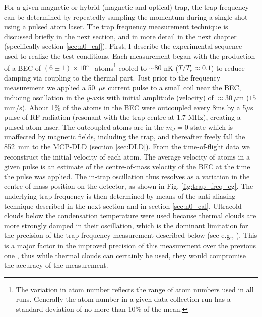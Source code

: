	For a given magnetic or hybrid (magnetic and optical) trap, the trap frequency can be determined by repeatedly sampling the momentum during a single shot using a pulsed atom laser. 
	The trap frequency measurement technique is discussed briefly in the next section, and in more detail in the next chapter (specifically section \ref{sec:n0_cal}). 
	First, I describe the experimental sequence used to realize the test conditions.
	Each measurement began with the production of a BEC of $(6\pm1)\times10^5$ \mhe~atoms\footnote{The variation in atom number reflects the range of atom numbers used in all runs. Generally the atom number in a given data collection run has a standard deviation of no more than 10\% of the mean.} cooled to $\sim80$ nK ($T/T_c\approx 0.1$) to reduce damping via coupling to the thermal part.
	Just prior to the frequency measurement we applied a 50~$\mu$s current pulse to a small coil near the BEC, inducing oscillation in the $y$-axis with initial amplitude (velocity) of $\approx30~\mu$m ($15$ mm/s).
	About 1\% of the atoms in the BEC were outcoupled every 8ms by a 5$\mu$s pulse of RF radiation (resonant with the trap centre at 1.7 MHz), creating a pulsed atom laser.
	The outcoupled atoms are in the $m_J=0$ state which is unaffected by magnetic fields, including the trap, and thereafter freely fall the 852~mm to the MCP-DLD (section \ref{sec:DLD}).
	From the time-of-flight data we reconstruct the initial velocity of each atom.
	The average velocity of atoms in a given pulse is an estimate of the centre-of-mass velocity of the BEC at the time the pulse was applied.
	The in-trap oscillation thus resolves as a variation in the centre-of-mass position on the detector, as shown in Fig. \ref{fig:trap_freq_eg}.
	The underlying trap frequency is then determined by means of the anti-aliasing technique described in the next section and in section \ref{sec:n0_cal}.
	Ultracold clouds below the condensation temperature were used because thermal clouds are more strongly damped in their oscillation, which is the dominant limitation for the precision of the trap frequency measurement described below (see e.g., \cite{Henson22_PAL}). 
	This is a major factor in the improved precision of this measurement over the previous one \cite{Henson15}, thus while thermal clouds can certainly be used, they would compromise the accuracy of the measurement.


